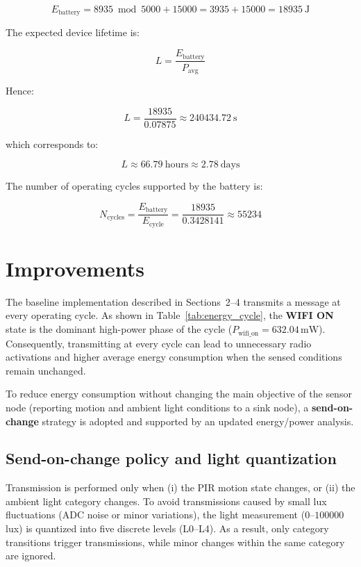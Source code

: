 \documentclass{article}
\begin{document}
\[
E_{\text{battery}} = 8935 \bmod 5000 + 15000 = 3935 + 15000 = 18935\ \text{J}
\]

The expected device lifetime is:

\[
L = \frac{E_{\text{battery}}}{P_{\text{avg}}}
\]

Hence:

\[
L = \frac{18935}{0.07875} \approx 240434.72\ \text{s}
\]

which corresponds to:

\[
L \approx 66.79\ \text{hours} \approx 2.78\ \text{days}
\]

The number of operating cycles supported by the battery is:

\[
N_{\text{cycles}} = \frac{E_{\text{battery}}}{E_{\text{cycle}}}
= \frac{18935}{0.3428141}
\approx 55234
\]

\section{Improvements}
\label{sec:improvements}

The baseline implementation described in Sections~2--4 transmits a message at every operating cycle.
As shown in Table~\ref{tab:energy_cycle}, the \textbf{WIFI ON} state is the dominant high-power phase of the cycle
(\(P_{\mathrm{wifi\_on}}=632.04\,\mathrm{mW}\)).
Consequently, transmitting at every cycle can lead to unnecessary radio activations and higher average energy consumption when the sensed conditions remain unchanged.

To reduce energy consumption without changing the main objective of the sensor node (reporting motion and ambient light conditions to a sink node),
a \textbf{send-on-change} strategy is adopted and supported by an updated energy/power analysis.

\subsection{Send-on-change policy and light quantization}
\label{subsec:send_on_change}

Transmission is performed only when (i) the PIR motion state changes, or (ii) the ambient light category changes.
To avoid transmissions caused by small lux fluctuations (ADC noise or minor variations), the light measurement
(\(0\)--\(100000\) lux) is quantized into five discrete levels (L0--L4).
As a result, only category transitions trigger transmissions, while minor changes within the same category are ignored.
\end{document}
